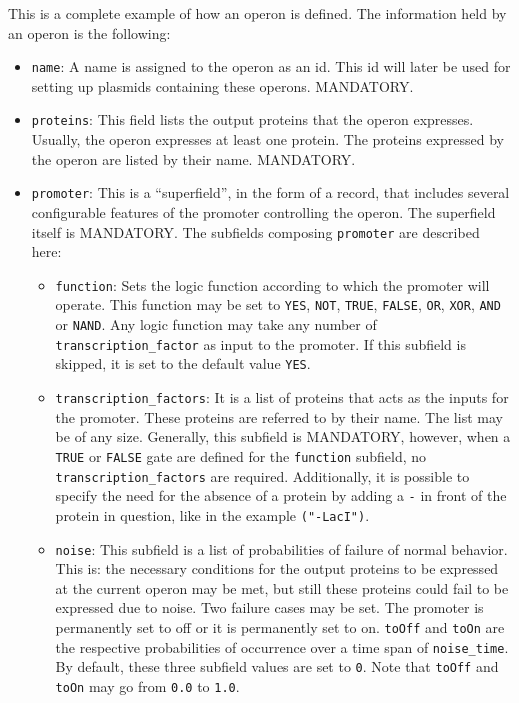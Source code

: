 \documentclass[10pt,a4paper]{article}
\begin{document}
This is a complete example of how an operon is defined. The information held by an operon is the following:
\begin{itemize}
	\item \texttt{name}: A name is assigned to the operon as an id. This id will later be used for setting up plasmids containing these operons. MANDATORY.
	\item \texttt{proteins}: This field lists the output proteins that the operon expresses. Usually, the operon expresses at least one protein. The proteins expressed by the operon are listed by their name. MANDATORY.
	\item \texttt{promoter}: This is a “superfield”, in the form of a record, that includes several configurable features of the promoter controlling the operon. The superfield itself is MANDATORY. The subfields composing \texttt{promoter} are described here:
		\begin{itemize}
			\item \texttt{function}: Sets the logic function according to which the promoter will operate. This function may be set to \texttt{YES}, \texttt{NOT}, \texttt{TRUE}, \texttt{FALSE}, \texttt{OR}, \texttt{XOR}, \texttt{AND} or \texttt{NAND}. Any logic function may take any number of \texttt{transcription\_factor} as input to the promoter. If this subfield is skipped, it is set to the default value \texttt{YES}.
			\item \texttt{transcription\_factors}: It is a list of proteins that acts as the inputs for the promoter. These proteins are referred to by their name. The list may be of any size. Generally, this subfield is MANDATORY, however, when a \texttt{TRUE} or \texttt{FALSE} gate are defined for the \texttt{function} subfield, no \texttt{transcription\_factors} are required. Additionally, it is possible to specify the need for the absence of a protein by adding a \texttt{-} in front of the protein in question, like in the example \texttt{("{}-LacI"{})}.
			\item \texttt{noise}: This subfield is a list of probabilities of failure of normal behavior. This is: the necessary conditions for the output proteins to be expressed at the current operon may be met, but still these proteins could fail to be expressed due to noise. Two failure cases may be set. The promoter is permanently set to off or it is permanently set to on. \texttt{toOff}  and \texttt{toOn} are the respective probabilities of occurrence over a time span of \texttt{noise\_time}. By default, these three subfield values are set to \texttt{0}. Note that \texttt{toOff} and \texttt{toOn} may go from \texttt{0.0} to \texttt{1.0}.

\end{itemize}
\end{itemize}
\end{document}
